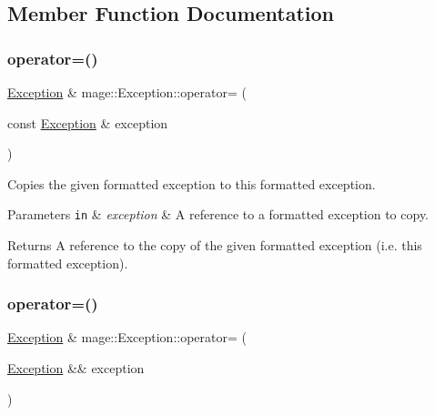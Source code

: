 \subsection{Member Function Documentation}
\mbox{\label{classmage_1_1_exception_ab0e7e6b32b07505271a4a88067ab54f4}} 
\subsubsection{\texorpdfstring{operator=()}{operator=()}\hspace{0.1cm}{\footnotesize\ttfamily [1/2]}}
{\footnotesize\ttfamily \mbox{\hyperlink{classmage_1_1_exception}{Exception}} \& mage\+::\+Exception\+::operator= (\begin{DoxyParamCaption}\item[{const \mbox{\hyperlink{classmage_1_1_exception}{Exception}} \&}]{exception }\end{DoxyParamCaption})\hspace{0.3cm}{\ttfamily [default]}}

Copies the given formatted exception to this formatted exception.


\begin{DoxyParams}[1]{Parameters}
\mbox{\tt in}  & {\em exception} & A reference to a formatted exception to copy. \\
\hline
\end{DoxyParams}
\begin{DoxyReturn}{Returns}
A reference to the copy of the given formatted exception (i.\+e. this formatted exception). 
\end{DoxyReturn}
\mbox{\label{classmage_1_1_exception_aa9305c6bd8836f56ffa970473533f031}} 
\subsubsection{\texorpdfstring{operator=()}{operator=()}\hspace{0.1cm}{\footnotesize\ttfamily [2/2]}}
{\footnotesize\ttfamily \mbox{\hyperlink{classmage_1_1_exception}{Exception}} \& mage\+::\+Exception\+::operator= (\begin{DoxyParamCaption}\item[{\mbox{\hyperlink{classmage_1_1_exception}{Exception}} \&\&}]{exception }\end{DoxyParamCaption})\hspace{0.3cm}{\ttfamily [default]}}

